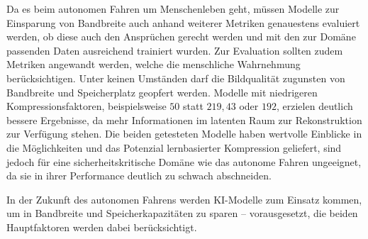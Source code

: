 \newpage
    Da es beim autonomen Fahren um Menschenleben geht, müssen Modelle zur Einsparung von Bandbreite auch anhand weiterer Metriken genauestens evaluiert werden, ob diese auch den Ansprüchen gerecht werden und mit den zur Domäne passenden Daten ausreichend trainiert wurden.
    Zur Evaluation sollten zudem Metriken angewandt werden, welche die menschliche Wahrnehmung berücksichtigen. Unter keinen Umständen darf die Bildqualität zugunsten von Bandbreite und Speicherplatz geopfert werden. Modelle mit niedrigeren Kompressionsfaktoren, beispielsweise $50$ statt $219,43$ oder $192$, erzielen deutlich bessere Ergebnisse, da mehr Informationen im latenten Raum zur Rekonstruktion zur Verfügung stehen.
    Die beiden getesteten Modelle haben wertvolle Einblicke in die Möglichkeiten und das Potenzial lernbasierter Kompression geliefert, sind jedoch für eine sicherheitskritische Domäne wie das autonome Fahren ungeeignet, da sie in ihrer Performance deutlich zu schwach abschneiden.

    In der Zukunft des autonomen Fahrens werden KI-Modelle zum Einsatz kommen,
    um in Bandbreite und Speicherkapazitäten zu sparen – vorausgesetzt, die beiden Hauptfaktoren werden dabei berücksichtigt.
    
    